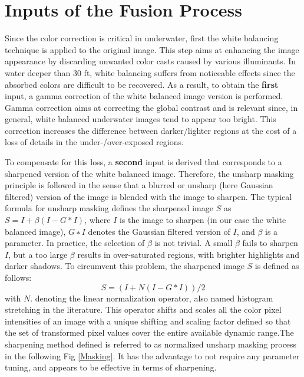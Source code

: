 \documentclass[hidelinks, 12pt]{report}
\begin{document}
\section{Inputs of the Fusion Process}
Since the color correction is critical in underwater, first the white balancing technique is applied to the original image. This step aims at enhancing the image appearance by discarding unwanted color casts caused by various illuminants. In water deeper than 30 ft, white balancing suffers from noticeable effects since the absorbed colors are difficult to be recovered. As a result, to obtain the \textbf{first} input, a gamma correction of the white balanced image version is performed. Gamma correction aims at correcting the global contrast and is relevant since, in general, white balanced underwater images tend to appear too bright. This correction increases the difference between darker/lighter regions at the cost of a loss of details in the under-/over-exposed regions.\\ \par 
To compensate for this loss, a \textbf{second} input is derived that corresponds to a sharpened version of the white balanced image. Therefore, the unsharp masking principle is followed in the sense that a blurred or unsharp (here Gaussian filtered) version of the image is blended with the image to sharpen. The typical formula for unsharp masking defines the sharpened image $S$ as $S=I+\beta(I-G*I)$, where $I$ is the image to sharpen (in our case the white balanced image), $G∗I$ denotes the Gaussian filtered version of $I$, and $\beta$ is a parameter. In practice, the selection of $\beta$ is not trivial. A small $\beta$ fails to sharpen $I$, but a too large $\beta$ results in over-saturated regions, with brighter highlights and darker shadows. To circumvent this problem, the sharpened image $S$ is defined as follows:
\begin{equation}
S=(I+N(I-G*I))/2
\end{equation}
with $N{.}$ denoting the linear normalization operator, also named histogram stretching in the literature. This operator shifts and scales all the color pixel intensities of an image with a unique shifting and scaling factor defined so that the set of transformed pixel values cover the entire available dynamic range.The sharpening method defined is referred to as normalized unsharp masking process in the following Fig \ref{Masking}. It has the advantage to not require any parameter tuning, and appears to be effective in terms of sharpening. 
\end{document}
